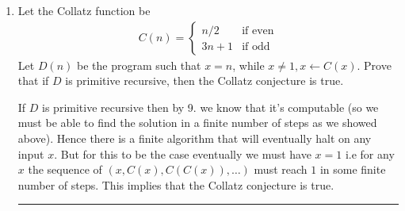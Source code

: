 \documentclass[11pt]{article}
\newenvironment{proof}{{\bf Proof:}}{\hfill\rule{2mm}{2mm}}
\begin{document}
\begin{enumerate}
\begin{proof}
        \vspace{1em}
        
        So we've showed using induction that all primitive recursive functions are computable.
      \end{proof}
    
    
    \item Let the Collatz function be
    \begin{align}
        C(n) = \begin{cases}
            n/2 & \text{if even}\\
            3n +1 & \text{if odd}
        \end{cases}
    \end{align}
    Let $D(n)$ be the program such that $x = n$, while $x \neq 1, x \leftarrow C(x)$. Prove that if $D$ is primitive recursive, then the Collatz conjecture is true. 

    \begin{proof}
      If $D$ is primitive recursive then by 9. we know that it's computable (so we must be able to find the solution in a finite number of steps as we showed above). Hence there is a finite algorithm that will eventually halt on any input $x$. But for this to be the case eventually we must have $x = 1$ i.e for any $x$ the sequence of $(x, C(x), C(C(x)), \dots)$ must reach $1$ in some finite number of steps. This implies that the Collatz conjecture is true.
    \end{proof}
\end{enumerate}

\nocite{*}
\printbibliography[title={Further Reading},notcategory=cited]
\end{document}
